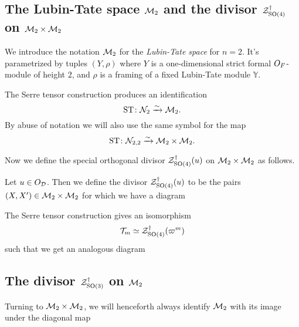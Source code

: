 \subsection{The Lubin-Tate space $\mathcal M_2$ and the divisor $\mathcal Z^{\dagger}_{\operatorname{SO}(4)}$ on $\mathcal M_2 \times \mathcal M_2$}
We introduce the notation $\mathcal M_2$ for the \emph{Lubin-Tate space} for $n = 2$.
It's parametrized by tuples $(Y, \rho)$
where $Y$ is a one-dimensional strict formal $O_F$-module of height $2$,
and $\rho$ is a framing of a fixed Lubin-Tate module $\mathbb{Y}$.

\begin{proposition}
  The Serre tensor construction produces an identification
  \[ \operatorname{ST} \colon \mathcal N_2 \xrightarrow{\sim} \mathcal M_2. \]
  By abuse of notation we will also use the same symbol for the map
  \[ \operatorname{ST} \colon \mathcal N_{2,2} \xrightarrow{\sim} \mathcal M_2 \times \mathcal M_2. \]
\end{proposition}

Now we define the special orthogonal divisor $\mathcal Z^{\dagger}_{\operatorname{SO}(4)}(u)$
on $\mathcal M_2 \times \mathcal M_2$ as follows.
\begin{definition}
  Let $u \in O_\mathcal D$.
  Then we define the divisor $\mathcal Z^{\dagger}_{\operatorname{SO}(4)}(u)$ to be
  the pairs $(X, X') \in \mathcal M_2 \times \mathcal M_2$
  for which we have a diagram
  \begin{center}
  \end{center}
\end{definition}
\begin{conjecture}
  The Serre tensor construction gives an isomorphism
  \[ \mathcal{T}_m \simeq \mathcal Z^{\dagger}_{\operatorname{SO}(4)}(\varpi^m) \]
  such that we get an analogous diagram
  \begin{center}
  \end{center}
\end{conjecture}

\subsection{The divisor $\mathcal Z^{\dagger}_{\operatorname{SO}(3)}$ on $\mathcal M_2$}
Turning to $\mathcal M_2 \times \mathcal M_2$, we will henceforth always identify $\mathcal M_2$
with its image under the diagonal map
\begin{center}
\end{center}

